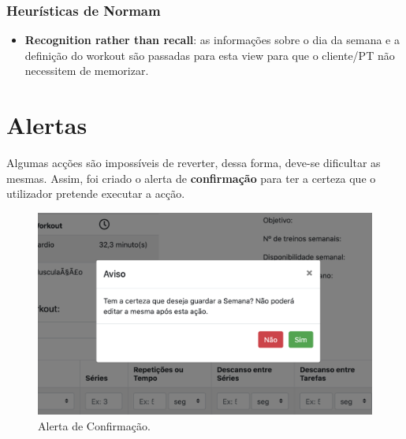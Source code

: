 \subsubsection{Heurísticas de Normam}
\begin{itemize}
    \item \textbf{Recognition rather than recall}: as informações sobre o dia da semana e a definição do workout são passadas para esta view para que o cliente/PT não necessitem de memorizar.
\end{itemize}


\section{Alertas}
\label{sec:alertas}

\hspace{5mm} Algumas acções são impossíveis de reverter, dessa forma, deve-se dificultar as mesmas. Assim, foi criado o alerta de \textbf{confirmação} para ter a certeza que o utilizador pretende executar a acção.

\begin{figure}[H]
    \centering
    \includegraphics[scale=0.45]{images/alerts/alerta_confirmacao.png}
    \caption{Alerta de Confirmação.}
    \label{fig:alertaconfirmação}
\end{figure}